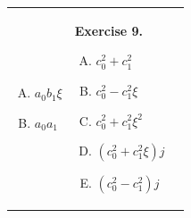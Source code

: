 \documentclass[../../book.tex]{subfiles}
\begin{document}
\begin{center}
\begin{tabular}{p{4.5cm}p{3cm}p{4cm}}
\begin{enumerate}[(A)]
            \item $a_0b_1\xi$
            \item $a_0a_1$
        \end{enumerate} & 
        \textbf{Exercise 9.}
        \begin{enumerate}[(A)]
            \item $c_0^2+c_1^2$
            \item $c_0^2-c_1^2\xi$
            \item $c_0^2+c_1^2\xi^2$
            \item $(c_0^2+c_1^2\xi)j$
            \item $(c_0^2-c_1^2)j$
        \end{enumerate} 
    \end{tabular}
\end{center}
\end{document}
